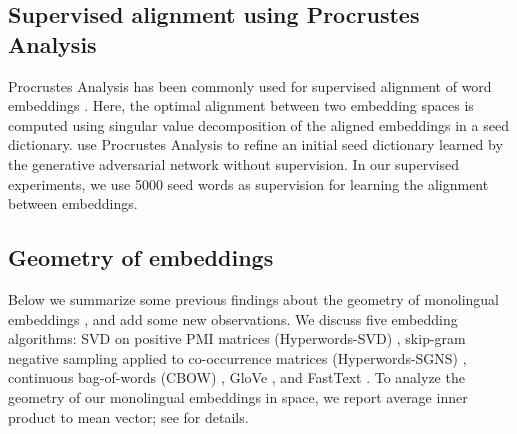 \documentclass[11pt,a4paper]{article}
\begin{document}


\subsection{Supervised alignment using Procrustes Analysis}
Procrustes Analysis \cite{Schonemann:66} has been commonly used for supervised alignment of word embeddings \cite{Smith2017, Artetxe2018}. Here, the optimal alignment between two embedding spaces is computed using singular value decomposition of the aligned embeddings in a seed dictionary. \citet{Conneau:ea:18} use Procrustes Analysis to refine an initial seed dictionary learned by the generative adversarial network without supervision. 
In our supervised experiments, we use 5000 seed words as supervision for learning the alignment between embeddings.
\subsection{Geometry of embeddings}

Below we summarize some previous findings about the geometry of monolingual embeddings \cite{Mimno:Thompson:17}, and add some new observations. We discuss five embedding algorithms: SVD on positive PMI matrices (Hyperwords-SVD) \cite{Levy15}, skip-gram negative sampling applied to co-occurrence matrices (Hyperwords-SGNS) \cite{Levy15}, continuous bag-of-words (CBOW) \cite{Mikolov2013a}, GloVe \cite{Pennington14}, and FastText \cite{bojanowski2017}. To analyze the geometry of our monolingual embeddings in space, we report average inner product to mean vector; see  for details. 
\end{document}
